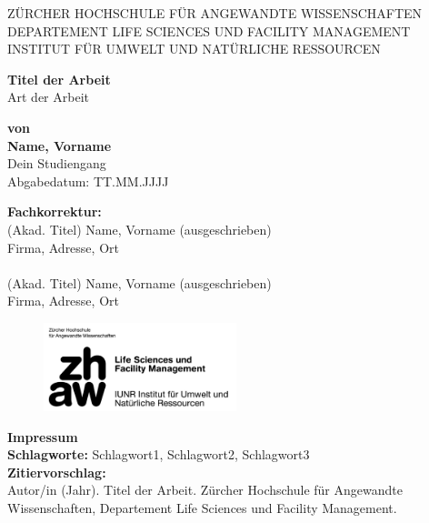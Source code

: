 \documentclass[a4paper,11pt,twoside]{article}
\begin{document}
	
	\begin{titlepage}
		\centering
		{\large \MakeUppercase{Zürcher Hochschule für Angewandte Wissenschaften}\\
			\MakeUppercase{Departement Life Sciences und Facility Management}\\
			\MakeUppercase{Institut für Umwelt und natürliche Ressourcen}\\[1.5cm]}
		
		{\Large \textbf{Titel der Arbeit}\\[1cm]}
		{\large{Art der Arbeit}\\[2cm]}
		
		\begin{center}
			\textbf{von}\\
			\textbf{Name, Vorname}\\
			Dein Studiengang\\
			Abgabedatum: TT.MM.JJJJ
		\end{center}
		
		\vspace{3cm}
		\begin{tabbing}
			\textbf{Fachkorrektur:} \\
			(Akad. Titel) Name, Vorname (ausgeschrieben)\\
			Firma, Adresse, Ort\\
			\\%
			(Akad. Titel) Name, Vorname (ausgeschrieben)\\
			Firma, Adresse, Ort\\
		\end{tabbing}
			
		\vfill
		\begin{figure}[t]
			\raggedleft
			\includegraphics[width=0.5\textwidth]{zhaw_lsfm_iunr_schwarz.jpg} %
		\end{figure}
	\end{titlepage}
	
	
	\newpage
	\thispagestyle{empty}
	\vspace*{18cm}
	\noindent
	\textbf{Impressum}\\[1cm]
	\textbf{Schlagworte:} Schlagwort1, Schlagwort2, Schlagwort3\\[0.5cm]
	\textbf{Zitiervorschlag:}\\
	Autor/in (Jahr). Titel der Arbeit. Zürcher Hochschule für Angewandte Wissenschaften, Departement Life Sciences und Facility Management.
	
\end{document}

